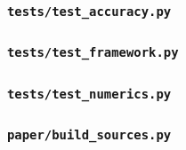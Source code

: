 \subsubsection*{\texttt{tests/test\_accuracy.py}}

\subsubsection*{\texttt{tests/test\_framework.py}}

\subsubsection*{\texttt{tests/test\_numerics.py}}

\subsubsection*{\texttt{paper/build\_sources.py}}

